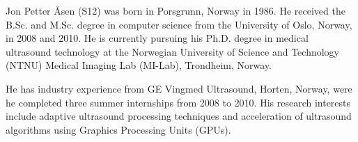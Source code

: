 \documentclass[journal]{IEEEtran}
\begin{document}

% 


\begin{IEEEbiography}{Jon Petter \AA{}sen}
(S12) was born in Porsgrunn, Norway in 1986. He received the B.Sc. and M.Sc. degree in computer science from the University of Oslo, Norway, in 2008 and 2010. He is currently pursuing his Ph.D. degree in medical ultrasound technology at the Norwegian University of Science and Technology (NTNU) Medical Imaging Lab (MI-Lab), Trondheim, Norway. 

He has industry experience from GE Vingmed Ultrasound, Horten, Norway, were he completed three summer internships from 2008 to 2010. His research interests include adaptive ultrasound processing techniques and acceleration of ultrasound algorithms using Graphics Processing Units (GPUs). 
\end{IEEEbiography}
\end{document}
